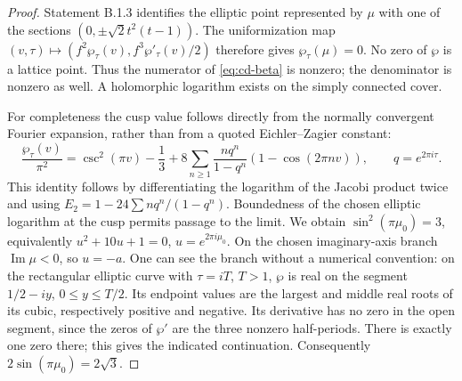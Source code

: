 \begin{proof}
Statement B.1.3 identifies the elliptic point represented by \(\mu\) with
one of the sections \((0,\pm\sqrt2t^2(t-1))\). The uniformization map
\((v,\tau)\mapsto(f^2\wp_\tau(v),f^3\wp'_\tau(v)/2)\) therefore gives
\(\wp_\tau(\mu)=0\). No zero of \(\wp\) is a lattice point. Thus the numerator
of \eqref{eq:cd-beta} is nonzero; the denominator is nonzero as well.
A holomorphic logarithm exists on the simply connected cover.

For completeness the cusp value follows directly from the normally
convergent Fourier expansion, rather than from a quoted Eichler--Zagier
constant:
\begin{equation}\label{eq:cd-wp}
 \frac{\wp_\tau(v)}{\pi^2}
 =\csc^2(\pi v)-\frac13+
 8\sum_{n\geq1}\frac{nq^n}{1-q^n}(1-\cos(2\pi nv)),
 \qquad q=e^{2\pi i\tau}.
\end{equation}
This identity follows by differentiating the logarithm of the Jacobi
product twice and using
\(E_2=1-24\sum nq^n/(1-q^n)\). Boundedness of the chosen elliptic logarithm
at the cusp permits passage to the limit. We obtain
\(\sin^2(\pi\mu_0)=3\), equivalently
\(u^2+10u+1=0\), \(u=e^{2\pi i\mu_0}\).
On the chosen imaginary-axis branch \(\operatorname{Im}\mu<0\), so \(u=-a\).
One can see the branch without a numerical convention: on the rectangular
elliptic curve with \(\tau=iT\), \(T>1\), \(\wp\) is real on the segment
\(1/2-iy\), \(0\leq y\leq T/2\). Its endpoint values are the largest and
middle real roots of its cubic, respectively positive and negative.
Its derivative has no zero in the open segment, since the zeros of
\(\wp'\) are the three nonzero half-periods. There is exactly one zero
there; this gives the indicated continuation. Consequently
\(2\sin(\pi\mu_0)=2\sqrt3\).


\end{proof}
